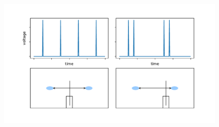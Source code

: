 \begin{figure}
	\centering
	\includegraphics[width=0.8\linewidth]{Chapters/beam-characterization/Spikes}
	\caption{}
	\label{fig:spikes}
\end{figure}
